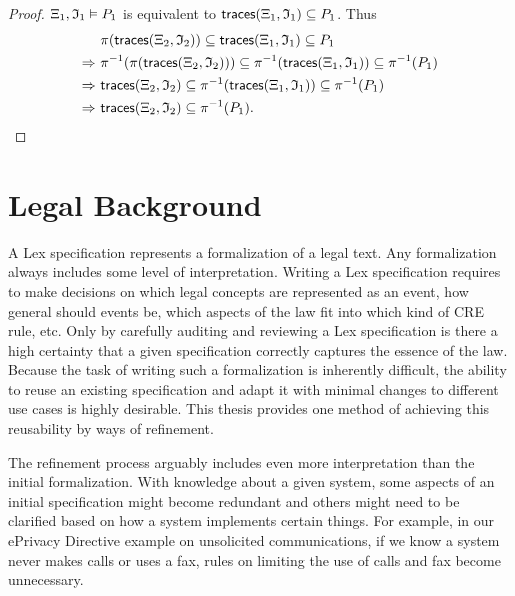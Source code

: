 \begin{proof}
    $\Xi_1, \mathfrak{I}_1 \vDash P_1$
    is equivalent to 
    $\mathsf{traces}(\Xi_1, \mathfrak{I}_1) \subseteq P_1$.
    Thus
    \begin{align*}
        &\pi(\mathsf{traces}(\Xi_2, \mathfrak{I}_2))
        \subseteq \mathsf{traces}(\Xi_1, \mathfrak{I}_1)
        \subseteq P_1 \\
        \Rightarrow~
        &\pi^{-1}(\pi(\mathsf{traces}(\Xi_2, \mathfrak{I}_2)))
        \subseteq \pi^{-1}(\mathsf{traces}(\Xi_1, \mathfrak{I}_1))
        \subseteq \pi^{-1}(P_1) \\
        \Rightarrow~
        &\mathsf{traces}(\Xi_2, \mathfrak{I}_2)
        \subseteq \pi^{-1}(\mathsf{traces}(\Xi_1, \mathfrak{I}_1))
        \subseteq \pi^{-1}(P_1) \\
        \Rightarrow~
        &\mathsf{traces}(\Xi_2, \mathfrak{I}_2)
        \subseteq \pi^{-1}(P_1).
    \end{align*}
\end{proof}


\section{Legal Background}

A Lex specification represents a formalization of a legal text.
Any formalization always includes some level of interpretation.
Writing a Lex specification requires to make decisions on
which legal concepts are represented as an event, how general
should events be, which aspects of the law fit into which kind
of CRE rule, etc.
Only by carefully auditing and reviewing a Lex specification
is there a high certainty
that a given specification correctly captures the essence of
the law.
Because the task of writing such a formalization is inherently
difficult, the ability to reuse an existing specification
and adapt it with minimal changes to different use cases
is highly desirable.
This thesis provides one method of achieving this reusability
by ways of refinement.

The refinement process arguably includes even more interpretation
than the initial formalization.
With knowledge about a given system, some aspects of an
initial specification might become redundant and others might
need to be clarified based on how a system implements certain
things.
For example, in our ePrivacy Directive example on
unsolicited communications, if we know a system never
makes calls or uses a fax, rules on limiting the use
of calls and fax become unnecessary.



